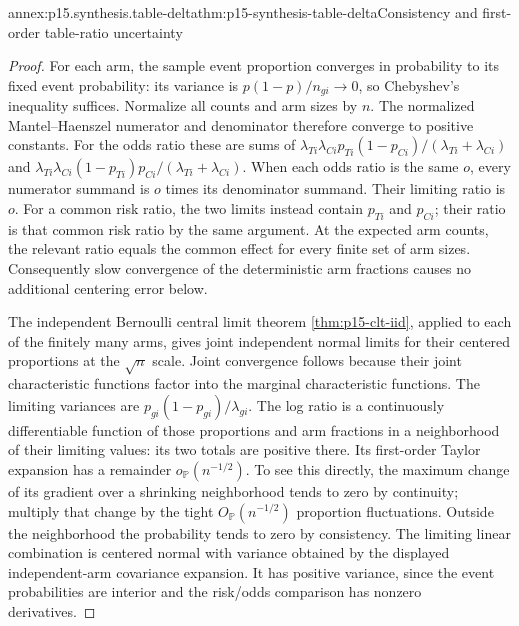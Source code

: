 \begin{annexitem}{annex:p15.synthesis.table-delta}{thm:p15-synthesis-table-delta}{Consistency and first-order table-ratio uncertainty}
\begin{proof}
For each arm, the sample event proportion converges in probability to its
fixed event probability: its variance is \(p(1-p)/n_{gi}\to0\),
so Chebyshev's inequality suffices. Normalize all counts and arm sizes by
\(n\). The normalized Mantel--Haenszel numerator and denominator therefore
converge to positive constants. For the odds ratio these are sums of
\(\lambda_{Ti}\lambda_{Ci}p_{Ti}(1-p_{Ci})/(\lambda_{Ti}+\lambda_{Ci})\)
and
\(\lambda_{Ti}\lambda_{Ci}(1-p_{Ti})p_{Ci}/(\lambda_{Ti}+\lambda_{Ci})\).
When each odds ratio is the same \(o\), every numerator summand is
\(o\) times its denominator summand. Their limiting ratio is \(o\).
For a common risk ratio, the two limits instead contain \(p_{Ti}\)
and \(p_{Ci}\); their ratio is that common risk ratio by the same argument.
At the expected arm counts, the relevant ratio equals the common effect
for every finite set of arm sizes. Consequently slow convergence of the
deterministic arm fractions causes no additional centering error below.

The independent Bernoulli central limit theorem
\ref{thm:p15-clt-iid}, applied to each of the finitely many arms, gives
joint independent normal limits for their centered proportions at the
\(\sqrt n\) scale. Joint convergence follows because their joint
characteristic functions factor into the marginal characteristic functions.
The limiting variances are \(p_{gi}(1-p_{gi})/\lambda_{gi}\).
The log ratio is a continuously differentiable function of those proportions
and arm fractions in a neighborhood of their limiting values: its two
totals are positive there. Its first-order Taylor expansion has a remainder
\(o_{\mathbb P}(n^{-1/2})\). To see this directly, the maximum change
of its gradient over a shrinking neighborhood tends to zero by continuity;
multiply that change by the tight \(O_{\mathbb P}(n^{-1/2})\)
proportion fluctuations. Outside the neighborhood the probability tends to
zero by consistency. The limiting linear combination is centered normal
with variance obtained by the displayed independent-arm covariance expansion.
It has positive variance, since the event probabilities are interior and
the risk/odds comparison has nonzero derivatives.


\end{proof}
\end{annexitem}
